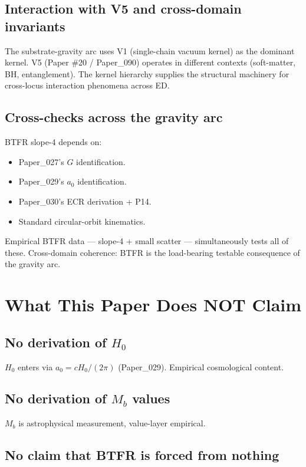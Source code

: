 \documentclass[11pt,a4paper]{article}
\begin{document}
\subsection{Interaction with V5 and cross-domain invariants}

The substrate-gravity arc uses V1 (single-chain vacuum kernel) as the dominant kernel. V5 (Paper \#20 / Paper\_090) operates in different contexts (soft-matter, BH, entanglement). The kernel hierarchy supplies the structural machinery for cross-locus interaction phenomena across ED.

\subsection{Cross-checks across the gravity arc}

BTFR slope-4 depends on:

\begin{itemize}[noitemsep]
\item Paper\_027's $G$ identification.
\item Paper\_029's $a_0$ identification.
\item Paper\_030's ECR derivation + P14.
\item Standard circular-orbit kinematics.
\end{itemize}

Empirical BTFR data --- slope-4 + small scatter --- simultaneously tests all of these. Cross-domain coherence: BTFR is the load-bearing testable consequence of the gravity arc.

\section{What This Paper Does NOT Claim}

\subsection{No derivation of $H_0$}

$H_0$ enters via $a_0 = cH_0/(2\pi)$ (Paper\_029). Empirical cosmological content.

\subsection{No derivation of $M_b$ values}

$M_b$ is astrophysical measurement, value-layer empirical.

\subsection{No claim that BTFR is forced from nothing}
\end{document}

